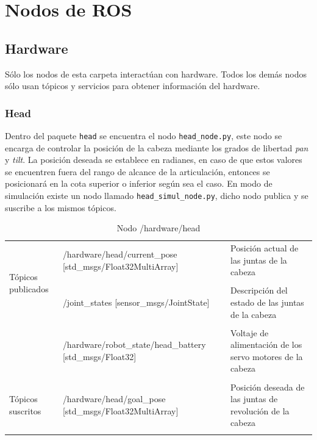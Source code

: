 \documentclass[user_manual.tex]{subfiles}
\begin{document}
 \chapter{Nodos de ROS}
 
\section{Hardware}
Sólo los nodos de esta carpeta interactúan con hardware. Todos los demás nodos sólo usan tópicos y servicios para obtener información del hardware.

\subsection{Head}
Dentro del paquete \texttt{head} se encuentra el nodo \texttt{head\_node.py}, este nodo se encarga de controlar la posición de la cabeza mediante los grados de libertad \textit{pan} y \textit{tilt}. La posición deseada se establece en radianes, en caso de que estos valores se encuentren fuera del rango de alcance de la articulación, entonces  se posicionará en la cota superior o inferior según sea el caso. En modo de simulación existe un nodo llamado \texttt{head\_simul\_node.py}, dicho nodo publica y se suscribe a los mismos tópicos.

\begin{table}[H]
\begin{center}
\begin{tabular}{|l|p{6.5cm}|p{4.5cm}|}%
\hline

\multirow{4}{*}{Tópicos publicados} 
&  /hardware/head/current\_pose [std\_msgs/Float32MultiArray]  & Posición actual de las juntas de la cabeza \\
& & \\
& /joint\_states [sensor\_msgs/JointState] & Descripción del estado de las juntas de la cabeza \\
& & \\
& /hardware/robot\_state/head\_battery [std\_msgs/Float32]  & Voltaje de alimentación de los servo motores de la cabeza\\ 
& & \\
\cline{1-3}

Tópicos suscritos &  /hardware/head/goal\_pose [std\_msgs/Float32MultiArray] & Posición deseada de las juntas de revolución de la cabeza \\ 
& & \\
\hline

\end{tabular}
\caption{Nodo /hardware/head}
\label{head node}
\end{center}
\end{table}
\end{document}
